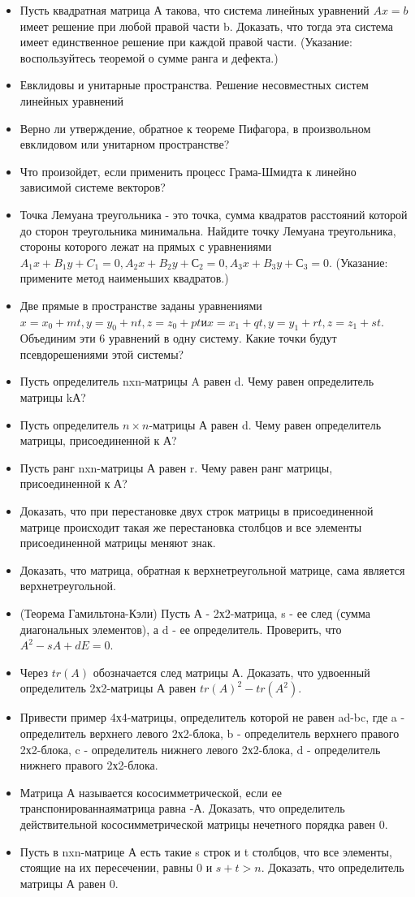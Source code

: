 \documentclass[a4paper]{article}
\begin{document}
\begin{itemize}
\item Пусть квадратная матрица А такова, что система линейных уравнений $Ax=b$ имеет решение при любой правой части b. Доказать, что тогда эта система имеет единственное решение при каждой правой части. (Указание: воспользуйтесь теоремой о сумме ранга и дефекта.)
\item Евклидовы и унитарные пространства. Решение несовместных систем линейных уравнений
\item Верно ли утверждение, обратное к теореме Пифагора, в произвольном евклидовом или унитарном пространстве?
\item Что произойдет, если применить процесс Грама-Шмидта к линейно зависимой системе векторов?
\item Точка Лемуана треугольника - это точка, сумма квадратов расстояний которой до сторон треугольника минимальна. Найдите точку Лемуана треугольника, стороны которого лежат на прямых с уравнениями $A_1x+B_1y+C_1=0, A_2x+B_2y+С_2=0, A_3x+B_3y+С_3=0$. (Указание: примените метод наименьших квадратов.)
\item Две прямые в пространстве заданы уравнениями $x=x_0+mt, y=y_0+nt, z=z_0+pt и x=x_1+qt, y=y_1+rt, z=z_1+st$. Объединим эти 6 уравнений в одну систему. Какие точки будут псевдорешениями этой системы?
\item Пусть определитель nxn-матрицы A равен d. Чему равен определитель матрицы kА?
\item Пусть определитель $n \times n$-матрицы А равен d. Чему равен определитель матрицы, присоединенной к А?
\item Пусть ранг nxn-матрицы А равен r. Чему равен ранг матрицы, присоединенной к А?
\item Доказать, что при перестановке двух строк матрицы в присоединенной матрице происходит такая же перестановка столбцов и все элементы присоединенной матрицы меняют знак.
\item Доказать, что матрица, обратная к верхнетреугольной матрице, сама является верхнетреугольной.
\item (Теорема Гамильтона-Кэли) Пусть А - 2х2-матрица, s - ее след (сумма диагональных элементов), а d - ее определитель. Проверить, что $A^2-sA+dE=0$.
\item Через $tr(A)$ обозначается след матрицы А. Доказать, что удвоенный определитель 2х2-матрицы А равен $tr(A)^2-tr(A^2)$.
\item Привести пример 4х4-матрицы, определитель которой не равен ad-bc, где a - определитель верхнего левого 2х2-блока, b - определитель верхнего правого 2х2-блока, c - определитель нижнего левого 2х2-блока, d - определитель нижнего правого 2х2-блока.
\item Матрица А называется кососимметрической, если ее транспонированнаяматрица равна -А. Доказать, что определитель действительной кососимметрической матрицы нечетного порядка равен 0.
\item Пусть в nxn-матрице А есть такие s строк и t столбцов, что все элементы, стоящие на их пересечении, равны 0 и $s+t>n$. Доказать, что определитель матрицы А равен 0.
\end{itemize}
\end{document}
